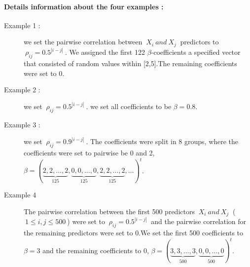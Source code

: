 \documentclass[12pt]{report}
\begin{document}
	\paragraph{Details information about the four examples :}
	\begin{description}
		\item[Example 1 :] we set the pairwise correlation between $\ X_{i}\ and\ X_{j}\ $ predictors to $\ \rho_{ij}=0.5^{|i-j|}\ $. We assigned the first 122 $\beta$-coefficients a specified vector that consisted of random values within [2,5].The remaining coefficients were set to 0.
		\item[Example 2 :] we set $\ \rho_{ij}=0.5^{|i-j|}\ $. we set all coefficients to be $\beta=0.8$.
		\item[Example 3 :] we set $\ \rho_{ij}=0.9^{|i-j|}\ $. The coefficients were split in 8 groups, where the coefficients were set to pairwise be 0 and 2, $\beta=(\underbrace{2,2,\dots,2}_{125},\underbrace{0,0,\dots,0}_{125},\underbrace{2,2,\dots,2}_{125},\dots)^{t}$.
		\item[Example 4] The pairwise correlation between the first 500 predictors $\ X_{i}\ and\ X_{j}\ $ ( $\ 1\leq i,j \leq 500\ $) were set to $\ \rho_{ij}=0.5^{|i-j|}\ $ and the pairwise correlation for the remaining predictors were set to 0.We set the first 500 coefficients to $ \beta=3 $ and the remaining coefficients to 0, $\beta=(\underbrace{3,3,\dots,3}_{500},\underbrace{0,0,\dots,0}_{500})^{t}$.
	\end{description}
\end{document}
